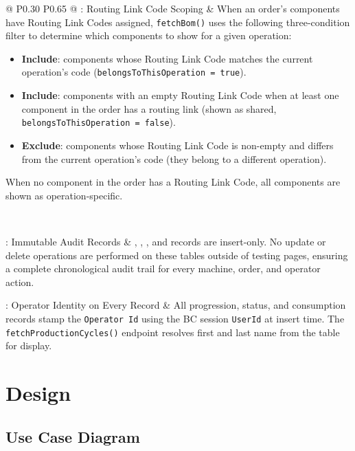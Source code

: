 \begin{longtable}{@{} P{0.30\linewidth} P{0.65\linewidth} @{}}
	: Routing Link Code Scoping & When an order's components have Routing Link Codes assigned, \texttt{fetchBom()} uses the following three-condition filter to determine which components to show for a given operation:
	\begin{itemize}[noitemsep, topsep=0pt, partopsep=0pt, leftmargin=*]
		\item \textbf{Include}: components whose Routing Link Code matches the current operation's code (\texttt{belongsToThisOperation = true}).
		\item \textbf{Include}: components with an empty Routing Link Code when at least one component in the order has a routing link (shown as shared, \texttt{belongsToThisOperation = false}).
		\item \textbf{Exclude}: components whose Routing Link Code is non-empty and differs from the current operation's code (they belong to a different operation).
	\end{itemize}
	When no component in the order has a Routing Link Code, all components are shown as operation-specific. \\
	\midrule
	
	 \\
	\midrule
	
	: Immutable Audit Records & , , , and  records are insert-only. No update or delete operations are performed on these tables outside of testing pages, ensuring a complete chronological audit trail for every machine, order, and operator action. \\
	\midrule
	
	: Operator Identity on Every Record & All progression, status, and consumption records stamp the \texttt{Operator Id} using the BC session \texttt{UserId} at insert time. The \texttt{fetchProductionCycles()} endpoint resolves first and last name from the  table for display. \\
\end{longtable}

\section{Design}

\subsection{Use Case Diagram}

